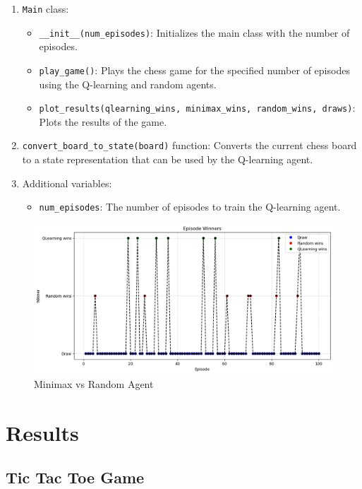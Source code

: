 \documentclass{article}
\begin{document}
\begin{enumerate}
  \item \texttt{Main} class:
    \begin{itemize}
      \item \texttt{\_\_init\_\_(num\_episodes)}: Initializes the main class with the number of episodes.
      \item \texttt{play\_game()}: Plays the chess game for the specified number of episodes using the Q-learning and random agents.
      \item \texttt{plot\_results(qlearning\_wins, minimax\_wins, random\_wins, draws)}: Plots the results of the game.
    \end{itemize}

  \item \texttt{convert\_board\_to\_state(board)} function: Converts the current chess board to a state representation that can be used by the Q-learning agent.

  \item Additional variables:
    \begin{itemize}
      \item \texttt{num\_episodes}: The number of episodes to train the Q-learning agent.
    \end{itemize}
\end{enumerate}
\begin{figure}[htbp]
    \centering
    \includegraphics[width=1.2\textwidth]{img 9.png}
    \caption{Minimax vs Random Agent}
    \label{fig:example}
\end{figure}



\section{Results}

\subsection{Tic Tac Toe Game}
\end{document}
